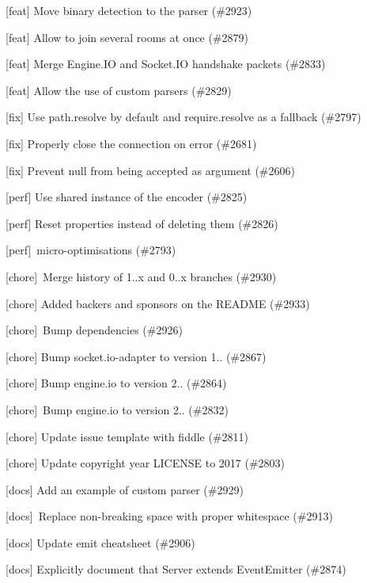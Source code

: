 \begin{DoxyItemize}
\item \mbox{[}feat\mbox{]} Move binary detection to the parser (\#2923)
\item \mbox{[}feat\mbox{]} Allow to join several rooms at once (\#2879)
\item \mbox{[}feat\mbox{]} Merge Engine.\+IO and Socket.\+IO handshake packets (\#2833)
\item \mbox{[}feat\mbox{]} Allow the use of custom parsers (\#2829)
\item \mbox{[}fix\mbox{]} Use path.\+resolve by default and require.\+resolve as a fallback (\#2797)
\item \mbox{[}fix\mbox{]} Properly close the connection on error (\#2681)
\item \mbox{[}fix\mbox{]} Prevent null from being accepted as argument (\#2606)
\item \mbox{[}perf\mbox{]} Use shared instance of the encoder (\#2825)
\item \mbox{[}perf\mbox{]} Reset properties instead of deleting them (\#2826)
\item \mbox{[}perf\mbox{]} micro-\/optimisations (\#2793)
\item \mbox{[}chore\mbox{]} \+Merge history of 1..\+x and 0..\+x branches (\#2930)
\item \mbox{[}chore\mbox{]} Added backers and sponsors on the R\+E\+A\+D\+ME (\#2933)
\item \mbox{[}chore\mbox{]} \+Bump dependencies (\#2926)
\item \mbox{[}chore\mbox{]} Bump socket.\+io-\/adapter to version 1.. (\#2867)
\item \mbox{[}chore\mbox{]} Bump engine.\+io to version 2.. (\#2864)
\item \mbox{[}chore\mbox{]} \+Bump engine.\+io to version 2.. (\#2832)
\item \mbox{[}chore\mbox{]} Update issue template with fiddle (\#2811)
\item \mbox{[}chore\mbox{]} Update copyright year L\+I\+C\+E\+N\+SE to 2017 (\#2803)
\item \mbox{[}docs\mbox{]} Add an example of custom parser (\#2929)
\item \mbox{[}docs\mbox{]} \+Replace non-\/breaking space with proper whitespace (\#2913)
\item \mbox{[}docs\mbox{]} Update emit cheatsheet (\#2906)
\item \mbox{[}docs\mbox{]} Explicitly document that Server extends Event\+Emitter (\#2874)

\end{DoxyItemize}
